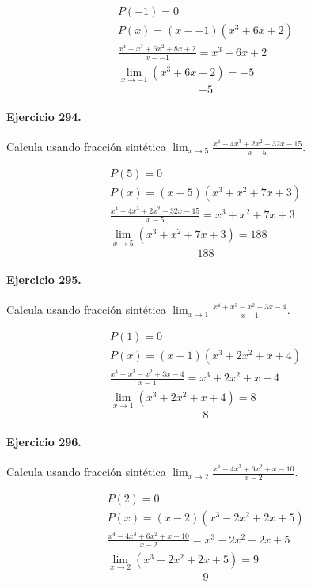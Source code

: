 \documentclass[11pt,a4paper]{article}
\begin{document}
\[
\begin{aligned}
P(-1)=0\\
P(x)=(x--1)(x^3 + 6x + 2)\\
\frac{x^4 + x^3 + 6x^2 + 8x + 2}{x--1}=x^3 + 6x + 2\\
\lim_{x\to -1}(x^3 + 6x + 2)=-5
\end{aligned}
\]
\[\boxed{-5}\]


\paragraph{Ejercicio 294.} Calcula usando fracción sintética $\displaystyle\lim_{x\to 5}\frac{x^4 - 4x^3 + 2x^2 - 32x - 15}{x-5}$. 

\[
\begin{aligned}
P(5)=0\\
P(x)=(x-5)(x^3 + x^2 + 7x + 3)\\
\frac{x^4 - 4x^3 + 2x^2 - 32x - 15}{x-5}=x^3 + x^2 + 7x + 3\\
\lim_{x\to 5}(x^3 + x^2 + 7x + 3)=188
\end{aligned}
\]
\[\boxed{188}\]


\paragraph{Ejercicio 295.} Calcula usando fracción sintética $\displaystyle\lim_{x\to 1}\frac{x^4 + x^3 - x^2 + 3x - 4}{x-1}$. 

\[
\begin{aligned}
P(1)=0\\
P(x)=(x-1)(x^3 + 2x^2 + x + 4)\\
\frac{x^4 + x^3 - x^2 + 3x - 4}{x-1}=x^3 + 2x^2 + x + 4\\
\lim_{x\to 1}(x^3 + 2x^2 + x + 4)=8
\end{aligned}
\]
\[\boxed{8}\]


\paragraph{Ejercicio 296.} Calcula usando fracción sintética $\displaystyle\lim_{x\to 2}\frac{x^4 - 4x^3 + 6x^2 + x - 10}{x-2}$. 

\[
\begin{aligned}
P(2)=0\\
P(x)=(x-2)(x^3 - 2x^2 + 2x + 5)\\
\frac{x^4 - 4x^3 + 6x^2 + x - 10}{x-2}=x^3 - 2x^2 + 2x + 5\\
\lim_{x\to 2}(x^3 - 2x^2 + 2x + 5)=9
\end{aligned}
\]
\[\boxed{9}\]
\end{document}
